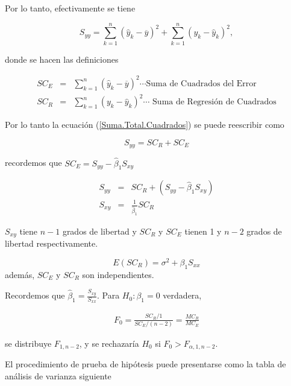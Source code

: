 \begin{itemize}
\begin{enumerate}
Por lo tanto, efectivamente se tiene

\begin{equation}\label{Suma.Total.Cuadrados}
S_{yy}=\sum_{k=1}^{n}\left(\hat{y}_{k}-\overline{y}\right)^{2}+\sum_{k=1}^{n}\left(y_{k}-\hat{y}_{k}\right)^{2},
\end{equation}

donde se hacen las definiciones

\begin{eqnarray}
SC_{E}&=&\sum_{k=1}^{n}\left(\hat{y}_{k}-\overline{y}\right)^{2}\cdots\textrm{Suma de Cuadrados del Error}\\
SC_{R}&=&\sum_{k=1}^{n}\left(y_{k}-\hat{y}_{k}\right)^{2}\cdots\textrm{ Suma de Regresi\'on de Cuadrados}
\end{eqnarray}

Por lo tanto la ecuaci\'on (\ref{Suma.Total.Cuadrados}) se puede reescribir como 

\begin{equation}\label{Suma.Total.Cuadrados.Dos}
S_{yy}=SC_{R}+SC_{E}
\end{equation}

recordemos que $SC_{E}=S_{yy}-\hat{\beta}_{1}S_{xy}$

\begin{eqnarray*}
S_{yy}&=&SC_{R}+\left( S_{yy}-\hat{\beta}_{1}S_{xy}\right)\\
S_{xy}&=&\frac{1}{\hat{\beta}_{1}}SC_{R}
\end{eqnarray*}

$S_{xy}$ tiene $n-1$ grados de libertad y $SC_{R}$ y $SC_{E}$ tienen 1 y $n-2$ grados de libertad respectivamente.

\begin{Prop}
\begin{equation}
E\left(SC_{R}\right)=\sigma^{2}+\beta_{1}S_{xx}
\end{equation}
adem\'as, $SC_{E}$ y $SC_{R}$ son independientes.
\end{Prop}

Recordemos que $\hat{\beta}_{1}=\frac{S_{xy}}{S_{xx}}$. Para $H_{0}:\beta_{1}=0$ verdadera,

\begin{eqnarray*}
F_{0}=\frac{SC_{R}/1}{SC_{E}/(n-2)}=\frac{MC_{R}}{MC_{E}}
\end{eqnarray*}

se distribuye $F_{1,n-2}$, y se rechazar\'ia $H_{0}$ si $F_{0}>F_{\alpha,1,n-2}$.

El procedimiento de prueba de hip\'otesis puede presentarse como la tabla de an\'alisis de varianza siguiente


\end{enumerate}
\end{itemize}
